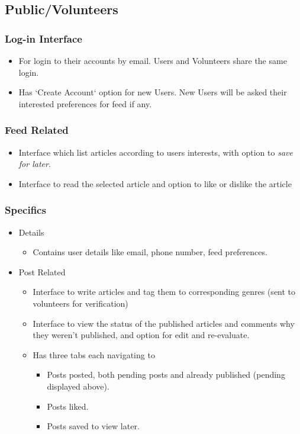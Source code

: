 \documentclass[titlepage,12pt]{article}
\begin{document}
\subsection{Public/Volunteers}
\subsubsection{Log-in Interface}
\begin{itemize}
 \setlength\itemsep{0.3em}
    \item For login to their accounts by email. Users and Volunteers share the same login.
\item Has `Create Account` option for new Users. New Users will be asked their interested preferences for feed if any.
\end{itemize}
\subsubsection{Feed Related}
\begin{itemize}
 \setlength\itemsep{0.3em}
    \item Interface which list articles according to users interests, with option to \textit{save for later}.
	\item Interface to read the selected article and option to like or dislike the article
\end{itemize}
\subsubsection{Specifics}
\begin{itemize}
    \setlength\itemsep{0.3em}
    \item Details 
            \begin{itemize}
            \item Contains user details like email, phone number, feed preferences.
            \end{itemize}
    \item Post Related 
        \textit{ }
            \begin{itemize}
            \setlength\itemsep{0.3em}
            \item Interface to write articles and tag them to corresponding genres (sent to volunteers for verification)
            \item Interface to view the status of the published articles and comments why they weren't published, and option for edit and re-evaluate.
            
            \item Has three tabs each navigating to 
                \begin{itemize}
                    \setlength\itemsep{0.3em}
                    \item Posts posted, both pending posts and already published  (pending displayed above).
                    \item Posts liked.
                    \item Posts saved to view later.
                \end{itemize}
            
            \end{itemize}
\end{itemize}
\end{document}
